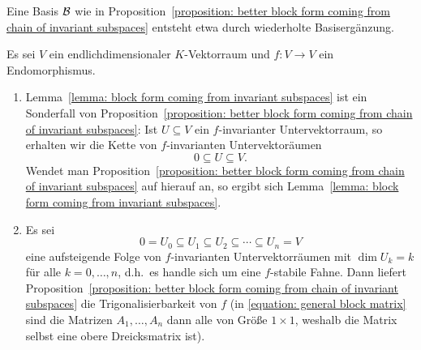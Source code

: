 \begin{remark}
  Eine Basis $\mathcal{B}$ wie in Proposition~\ref{proposition: better block form coming from chain of invariant subspaces} entsteht etwa durch wiederholte Basisergänzung.
\end{remark}

\begin{example}
  Es sei $V$ ein endlichdimensionaler $K$-Vektorraum und $f \colon V \to V$ ein Endomorphismus.
  \begin{enumerate}
    \item
      Lemma~\ref{lemma: block form coming from invariant subspaces} ist ein Sonderfall von Proposition~\ref{proposition: better block form coming from chain of invariant subspaces}:
      Ist $U \subseteq V$ ein $f$-invarianter Untervektorraum, so erhalten wir die Kette von $f$-invarianten Untervektoräumen
      \[
                  0
        \subseteq U
        \subseteq V.
      \]
      Wendet man Proposition~\ref{proposition: better block form coming from chain of invariant subspaces} auf hierauf an, so ergibt sich Lemma~\ref{lemma: block form coming from invariant subspaces}.
    \item
      Es sei
      \[
                  0
        =         U_0
        \subseteq U_1
        \subseteq U_2
        \subseteq \dotsb
        \subseteq U_n
        =         V
      \]
      eine aufsteigende Folge von $f$-invarianten Untervektorräumen mit $\dim U_k = k$ für alle $k = 0, \dotsc, n$, d.h.\ es handle sich um eine $f$-stabile Fahne.
      Dann liefert Proposition~\ref{proposition: better block form coming from chain of invariant subspaces} die Trigonalisierbarkeit von $f$ (in \eqref{equation: general block matrix} sind die Matrizen $A_1, \dotsc, A_n$ dann alle von Größe $1 \times 1$, weshalb die Matrix selbst eine obere Dreicksmatrix ist).
  \end{enumerate}
\end{example}
